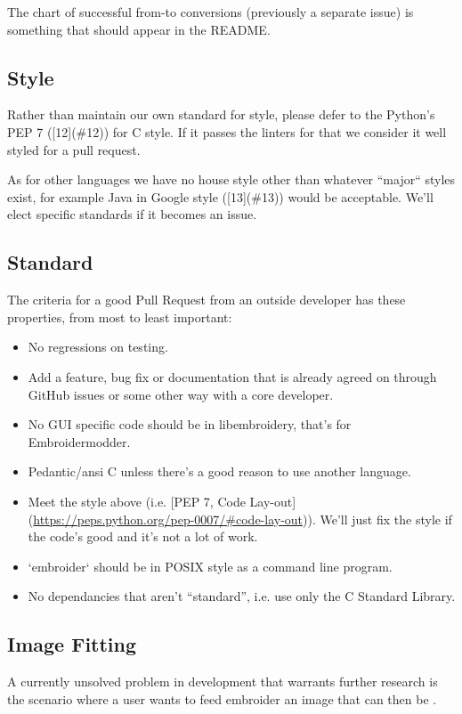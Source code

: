 \documentclass{report}
\begin{document}
The chart of successful from-to conversions (previously a separate issue)
is something that should appear in the README.

\subsection{Style}

Rather than maintain our own standard for style, please defer to
the Python's PEP 7 ([12](\#12)) for C style.
If it passes the linters for that we consider it well styled
for a pull request.

As for other languages we have no house style other than whatever
``major`` styles exist, for example Java in
Google style ([13](\#13))
would be acceptable. We'll elect specific standards if it becomes
an issue.

\subsection{Standard}

The criteria for a good Pull Request from an outside developer has these properties, from most to least important:

\begin{itemize}
\item No regressions on testing.
\item Add a feature, bug fix or documentation that is already agreed on through GitHub issues or some other way with a core developer.
\item No GUI specific code should be in libembroidery, that's for Embroidermodder.
\item Pedantic/ansi C unless there's a good reason to use another language.
\item Meet the style above (i.e. [PEP 7, Code Lay-out](\url{https://peps.python.org/pep-0007/#code-lay-out})). We'll just fix the style if the code's good and it's not a lot of work.
\item `embroider` should be in POSIX style as a command line program.
\item No dependancies that aren't ``standard'', i.e. use only the C Standard Library.
\end{itemize}

\subsection{Image Fitting}

A currently unsolved problem in development that warrants further research is
the scenario where a user wants to feed embroider an image that can then be .
\end{document}

